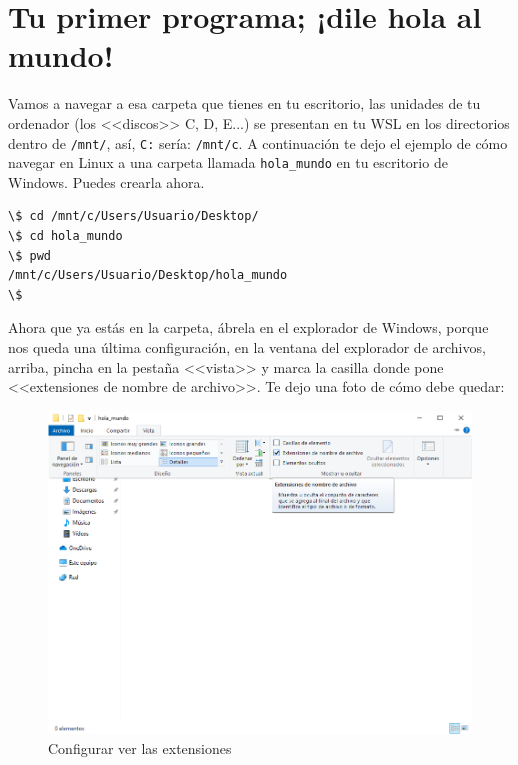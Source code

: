 \documentclass[a4paper]{article}
\begin{document}
\section{Tu primer programa; ¡dile hola al mundo!}

Vamos a navegar a esa carpeta que tienes en tu escritorio, las unidades de tu
ordenador (los <<discos>> C, D, E...) se presentan en tu WSL en los
directorios dentro de
\verb!/mnt/!, así, \verb!C:! sería: \verb!/mnt/c!. A continuación te dejo el
ejemplo de cómo navegar en Linux a una carpeta llamada \verb!hola_mundo! en
tu escritorio de Windows. Puedes crearla ahora.


\noindent
\begin{minipage}[H]{\linewidth}
\mbox{}
\begin{lstlisting}[style=terminalStyle]
\$ cd /mnt/c/Users/Usuario/Desktop/
\$ cd hola_mundo
\$ pwd
/mnt/c/Users/Usuario/Desktop/hola_mundo
\$
\end{lstlisting}
\end{minipage}


Ahora que ya estás en la carpeta, ábrela en el explorador de Windows, porque
nos queda una última configuración, en la ventana del explorador de archivos,
arriba, pincha en la pestaña <<vista>> y marca la casilla donde pone
<<extensiones de nombre de archivo>>. Te dejo una foto de cómo debe quedar:

\begin{figure}[H]
    \includegraphics[width=\linewidth]{extensions}
    \caption{Configurar ver las extensiones}
    \label{img:extensions}
\end{figure}
\end{document}
